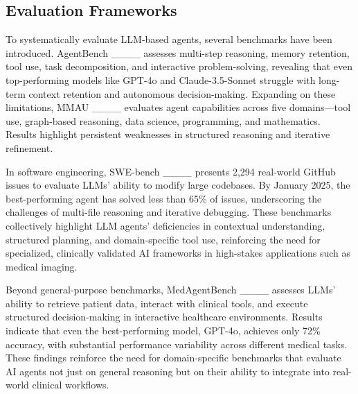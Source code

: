 \subsection{Evaluation Frameworks}
To systematically evaluate LLM-based agents, several benchmarks have been introduced. AgentBench ____ assesses multi-step reasoning, memory retention, tool use, task decomposition, and interactive problem-solving, revealing that even top-performing models like GPT-4o and Claude-3.5-Sonnet struggle with long-term context retention and autonomous decision-making. Expanding on these limitations, MMAU ____ evaluates agent capabilities across five domains—tool use, graph-based reasoning, data science, programming, and mathematics. Results highlight persistent weaknesses in structured reasoning and iterative refinement.

In software engineering, SWE-bench ____ presents 2,294 real-world GitHub issues to evaluate LLMs' ability to modify large codebases. By January 2025, the best-performing agent has solved less than 65\% of issues, underscoring the challenges of multi-file reasoning and iterative debugging. These benchmarks collectively highlight LLM agents' deficiencies in contextual understanding, structured planning, and domain-specific tool use, reinforcing the need for specialized, clinically validated AI frameworks in high-stakes applications such as medical imaging.

Beyond general-purpose benchmarks, MedAgentBench ____ assesses LLMs' ability to retrieve patient data, interact with clinical tools, and execute structured decision-making in interactive healthcare environments. Results indicate that even the best-performing model, GPT-4o, achieves only 72\% accuracy, with substantial performance variability across different medical tasks. These findings reinforce the need for domain-specific benchmarks that evaluate AI agents not just on general reasoning but on their ability to integrate into real-world clinical workflows.
